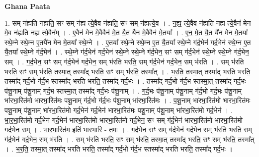 \documentclass[17pt]{extarticle}
\begin{document}
\textbf{Ghana Paata } \newline

1. सम् न॑ह्यति नह्यति॒ सꣳ सम् न॑ह्य त्ये॒वैव न॑ह्यति॒ सꣳ सम् न॑ह्यत्ये॒व । . न॒ह्य॒ त्ये॒वैव न॑ह्यति नह्य त्ये॒वैन॑ मेन मे॒व न॑ह्यति नह्य त्ये॒वैन᳚म् । . ए॒वैन॑ मेन मे॒वैवैन॑ मे॒त यै॒त यै॑न मे॒वैवैन॑ मे॒तया᳚ । . ए॒न॒ मे॒त यै॒त यै॑न मेन मे॒तया᳚ स्थे॒म्ने स्थे॒म्न ए॒तयै॑न मेन मे॒तया᳚ स्थे॒म्ने । . ए॒तया᳚ स्थे॒म्ने स्थे॒म्न ए॒त यै॒तया᳚ स्थे॒म्ने ग॑र्द॒भेन॑ गर्द॒भेन॑ स्थे॒म्न ए॒त यै॒तया᳚ स्थे॒म्ने ग॑र्द॒भेन॑ । . स्थे॒म्ने ग॑र्द॒भेन॑ गर्द॒भेन॑ स्थे॒म्ने स्थे॒म्ने ग॑र्द॒भेन॒ सꣳ सम् ग॑र्द॒भेन॑ स्थे॒म्ने स्थे॒म्ने ग॑र्द॒भेन॒ सम् । . ग॒र्द॒भेन॒ सꣳ सम् ग॑र्द॒भेन॑ गर्द॒भेन॒ सम् भ॑रति भरति॒ सम् ग॑र्द॒भेन॑ गर्द॒भेन॒ सम् भ॑रति । . सम् भ॑रति भरति॒ सꣳ सम् भ॑रति॒ तस्मा॒त् तस्मा᳚द् भरति॒ सꣳ सम् भ॑रति॒ तस्मा᳚त् । . भ॒र॒ति॒ तस्मा॒त् तस्मा᳚द् भरति भरति॒ तस्मा᳚द् गर्द॒भो ग॑र्द॒भ स्तस्मा᳚द् भरति भरति॒ तस्मा᳚द् गर्द॒भः । . तस्मा᳚द् गर्द॒भो ग॑र्द॒भ स्तस्मा॒त् तस्मा᳚द् गर्द॒भः प॑शू॒नाम् प॑शू॒नाम् ग॑र्द॒भ स्तस्मा॒त् तस्मा᳚द् गर्द॒भः प॑शू॒नाम् । . ग॒र्द॒भः प॑शू॒नाम् प॑शू॒नाम् ग॑र्द॒भो ग॑र्द॒भः प॑शू॒नाम् भा॑रभा॒रित॑मो भारभा॒रित॑मः पशू॒नाम् ग॑र्द॒भो ग॑र्द॒भः प॑शू॒नाम् भा॑रभा॒रित॑मः । . प॒शू॒नाम् भा॑रभा॒रित॑मो भारभा॒रित॑मः पशू॒नाम् प॑शू॒नाम् भा॑रभा॒रित॑मो गर्द॒भेन॑ गर्द॒भेन॑ भारभा॒रित॑मः पशू॒नाम् प॑शू॒नाम् भा॑रभा॒रित॑मो गर्द॒भेन॑ । . भा॒र॒भा॒रित॑मो गर्द॒भेन॑ गर्द॒भेन॑ भारभा॒रित॑मो भारभा॒रित॑मो गर्द॒भेन॒ सꣳ सम् ग॑र्द॒भेन॑ भारभा॒रित॑मो भारभा॒रित॑मो गर्द॒भेन॒ सम् । . भा॒र॒भा॒रित॑म॒ इति॑ भारभा॒रि - त॒मः॒ । . ग॒र्द॒भेन॒ सꣳ सम् ग॑र्द॒भेन॑ गर्द॒भेन॒ सम् भ॑रति भरति॒ सम् ग॑र्द॒भेन॑ गर्द॒भेन॒ सम् भ॑रति । . सम् भ॑रति भरति॒ सꣳ सम् भ॑रति॒ तस्मा॒त् तस्मा᳚द् भरति॒ सꣳ सम् भ॑रति॒ तस्मा᳚त् । . भ॒र॒ति॒ तस्मा॒त् तस्मा᳚द् भरति भरति॒ तस्मा᳚द् गर्द॒भो ग॑र्द॒भ स्तस्मा᳚द् भरति भरति॒ तस्मा᳚द् गर्द॒भः । \newline
\end{document}
